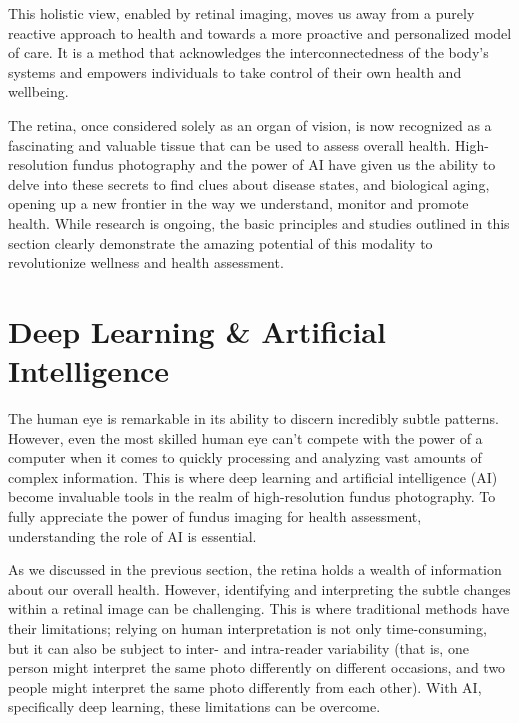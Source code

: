 \documentclass[
  Letterpaper,
]{scrbook}
\begin{document}
This holistic view, enabled by retinal imaging, moves us away from a
purely reactive approach to health and towards a more proactive and
personalized model of care. It is a method that acknowledges the
interconnectedness of the body's systems and empowers individuals to
take control of their own health and wellbeing.

The retina, once considered solely as an organ of vision, is now
recognized as a fascinating and valuable tissue that can be used to
assess overall health. High-resolution fundus photography and the power
of AI have given us the ability to delve into these secrets to find
clues about disease states, and biological aging, opening up a new
frontier in the way we understand, monitor and promote health. While
research is ongoing, the basic principles and studies outlined in this
section clearly demonstrate the amazing potential of this modality to
revolutionize wellness and health assessment.

\section{Deep Learning \& Artificial
Intelligence}\label{deep-learning-artificial-intelligence}

The human eye is remarkable in its ability to discern incredibly subtle
patterns. However, even the most skilled human eye can't compete with
the power of a computer when it comes to quickly processing and
analyzing vast amounts of complex information. This is where deep
learning and artificial intelligence (AI) become invaluable tools in the
realm of high-resolution fundus photography. To fully appreciate the
power of fundus imaging for health assessment, understanding the role of
AI is essential.

As we discussed in the previous section, the retina holds a wealth of
information about our overall health. However, identifying and
interpreting the subtle changes within a retinal image can be
challenging. This is where traditional methods have their limitations;
relying on human interpretation is not only time-consuming, but it can
also be subject to inter- and intra-reader variability (that is, one
person might interpret the same photo differently on different
occasions, and two people might interpret the same photo differently
from each other). With AI, specifically deep learning, these limitations
can be overcome.
\end{document}
